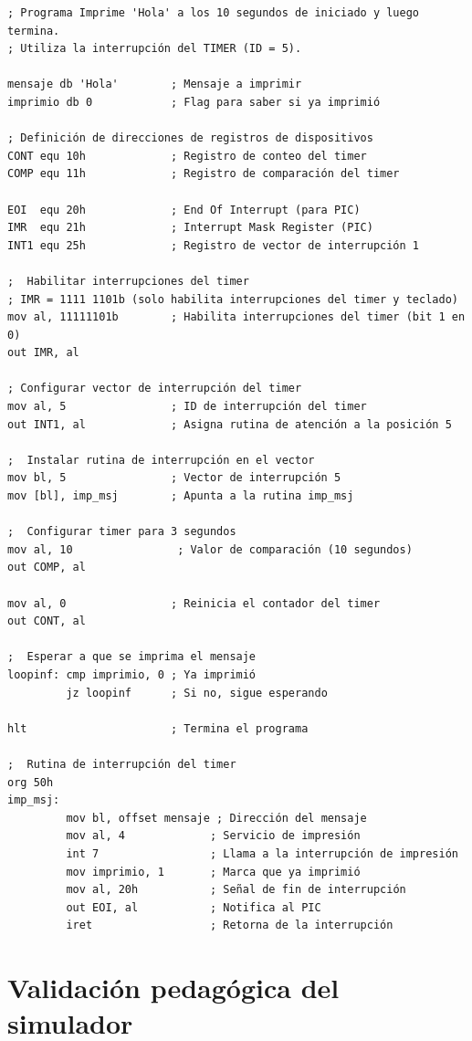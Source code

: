 \documentclass[12pt,oneside]{templates/unerthesis}
\begin{document}
\begin{lstlisting}
; Programa Imprime 'Hola' a los 10 segundos de iniciado y luego termina.
; Utiliza la interrupción del TIMER (ID = 5).

mensaje db 'Hola'        ; Mensaje a imprimir
imprimio db 0            ; Flag para saber si ya imprimió

; Definición de direcciones de registros de dispositivos
CONT equ 10h             ; Registro de conteo del timer
COMP equ 11h             ; Registro de comparación del timer

EOI  equ 20h             ; End Of Interrupt (para PIC)
IMR  equ 21h             ; Interrupt Mask Register (PIC)
INT1 equ 25h             ; Registro de vector de interrupción 1

;  Habilitar interrupciones del timer 
; IMR = 1111 1101b (solo habilita interrupciones del timer y teclado)
mov al, 11111101b        ; Habilita interrupciones del timer (bit 1 en 0)
out IMR, al

; Configurar vector de interrupción del timer 
mov al, 5                ; ID de interrupción del timer
out INT1, al             ; Asigna rutina de atención a la posición 5

;  Instalar rutina de interrupción en el vector 
mov bl, 5                ; Vector de interrupción 5
mov [bl], imp_msj        ; Apunta a la rutina imp_msj

;  Configurar timer para 3 segundos 
mov al, 10                ; Valor de comparación (10 segundos)
out COMP, al

mov al, 0                ; Reinicia el contador del timer
out CONT, al

;  Esperar a que se imprima el mensaje 
loopinf: cmp imprimio, 0 ; Ya imprimió
         jz loopinf      ; Si no, sigue esperando

hlt                      ; Termina el programa

;  Rutina de interrupción del timer 
org 50h
imp_msj:
         mov bl, offset mensaje ; Dirección del mensaje
         mov al, 4             ; Servicio de impresión
         int 7                 ; Llama a la interrupción de impresión
         mov imprimio, 1       ; Marca que ya imprimió
         mov al, 20h           ; Señal de fin de interrupción
         out EOI, al           ; Notifica al PIC
         iret                  ; Retorna de la interrupción\end{lstlisting}

\hypertarget{validacionpedagogica}{%
\section{Validación pedagógica del simulador}\label{validacionpedagogica}}
\end{document}
